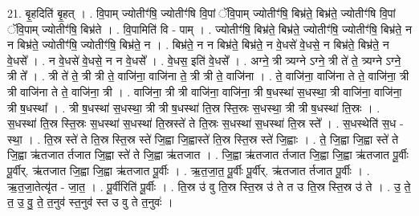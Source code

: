 \documentclass[17pt]{extarticle}
\begin{document}
21. बृ॒हदिति॑ बृ॒हत् । . वि॒पाम् ज्योतीꣳ॑षि॒ ज्योतीꣳ॑षि वि॒पां ॅवि॒पाम् ज्योतीꣳ॑षि॒ बिभ्र॑ते॒ बिभ्र॑ते॒ ज्योतीꣳ॑षि वि॒पां ॅवि॒पाम् ज्योतीꣳ॑षि॒ बिभ्र॑ते । . वि॒पामिति॑ वि - पाम् । . ज्योतीꣳ॑षि॒ बिभ्र॑ते॒ बिभ्र॑ते॒ ज्योतीꣳ॑षि॒ ज्योतीꣳ॑षि॒ बिभ्र॑ते॒ न न बिभ्र॑ते॒ ज्योतीꣳ॑षि॒ ज्योतीꣳ॑षि॒ बिभ्र॑ते॒ न । . बिभ्र॑ते॒ न न बिभ्र॑ते॒ बिभ्र॑ते॒ न वे॒धसे॑ वे॒धसे॒ न बिभ्र॑ते॒ बिभ्र॑ते॒ न वे॒धसे᳚ । . न वे॒धसे॑ वे॒धसे॒ न न वे॒धसे᳚ । . वे॒धस॒ इति॑ वे॒धसे᳚ । . अग्ने॒ त्री त्र्यग्ने ऽग्ने॒ त्री ते॑ ते॒ त्र्यग्ने ऽग्ने॒ त्री ते᳚ । . त्री ते॑ ते॒ त्री त्री ते॒ वाजि॑ना॒ वाजि॑ना ते॒ त्री त्री ते॒ वाजि॑ना । . ते॒ वाजि॑ना॒ वाजि॑ना ते ते॒ वाजि॑ना॒ त्री त्री वाजि॑ना ते ते॒ वाजि॑ना॒ त्री । . वाजि॑ना॒ त्री त्री वाजि॑ना॒ वाजि॑ना॒ त्री ष॒धस्था॑ स॒धस्था॒ त्री वाजि॑ना॒ वाजि॑ना॒ त्री ष॒धस्था᳚ । . त्री ष॒धस्था॑ स॒धस्था॒ त्री त्री ष॒धस्था॑ ति॒स्र स्ति॒स्रः स॒धस्था॒ त्री त्री ष॒धस्था॑ ति॒स्रः । . स॒धस्था॑ ति॒स्र स्ति॒स्रः स॒धस्था॑ स॒धस्था॑ ति॒स्रस्ते॑ ते ति॒स्रः स॒धस्था॑ स॒धस्था॑ ति॒स्र स्ते᳚ । . स॒धस्थेति॑ स॒ध - स्था॒ । . ति॒स्र स्ते॑ ते ति॒स्र स्ति॒स्र स्ते॑ जि॒ह्वा जि॒ह्वास्ते॑ ति॒स्र स्ति॒स्र स्ते॑ जि॒ह्वाः । . ते॒ जि॒ह्वा जि॒ह्वा स्ते॑ ते जि॒ह्वा ऋ॑तजात र्तजात जि॒ह्वा स्ते॑ ते जि॒ह्वा ऋ॑तजात । . जि॒ह्वा ऋ॑तजात र्तजात जि॒ह्वा जि॒ह्वा ऋ॑तजात पू॒र्वीः पू॒र्वीर्. ऋ॑तजात जि॒ह्वा जि॒ह्वा ऋ॑तजात पू॒र्वीः । . ऋ॒त॒जा॒त॒ पू॒र्वीः पू॒र्वीर्. ऋ॑तजात र्तजात पू॒र्वीः । . ऋ॒त॒जा॒तेत्यृ॑त - जा॒त॒ । . पू॒र्वीरिति॑ पू॒र्वीः । . ति॒स्र उ॑ वु ति॒स्र स्ति॒स्र उ॑ ते त उ ति॒स्र स्ति॒स्र उ॑ ते । . उ॒ ते॒ त॒ उ॒ वु॒ ते॒ त॒नुव॑ स्त॒नुव॑ स्त उ वु ते त॒नुवः॑ । \newline
\end{document}
